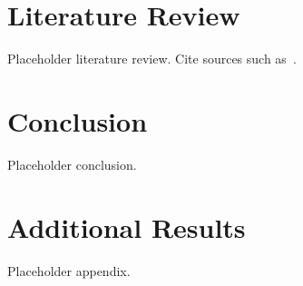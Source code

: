 \documentclass[12pt,a4paper,oneside]{report}
\begin{document}


\chapter{Literature Review}
\label{ch:litreview}
Placeholder literature review. Cite sources such as~\cite{placeholder-thesis}.

\chapter{Conclusion}
\label{ch:conclusion}
Placeholder conclusion.

\appendix

\chapter{Additional Results}
\label{ch:appendix}
Placeholder appendix.

\printbibliography[heading=bibintoc]
\end{document}
